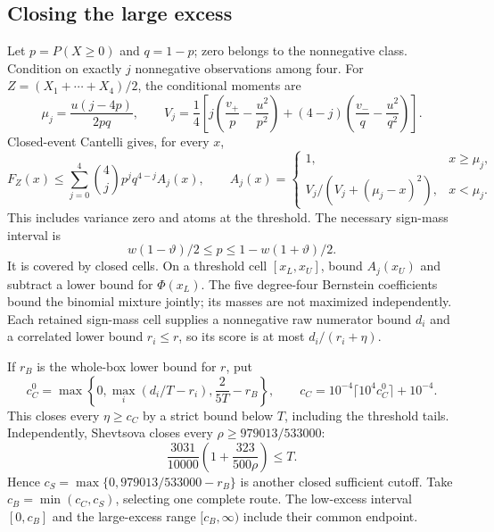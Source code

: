 \documentclass[11pt,a4paper]{article}
\numberwithin{equation}{section}
\theoremstyle{definition}
\theoremstyle{remark}
\begin{document}
\subsection{Closing the large excess}
Let $p=P(X\ge0)$ and $q=1-p$; zero belongs to the nonnegative class.
Condition on exactly $j$ nonnegative observations among four.
For $Z=(X_1+\cdots+X_4)/2$, the conditional moments are
\[
 \mu_j=\frac{u(j-4p)}{2pq},\qquad
 V_j=\frac14\left[j\left(\frac{v_+}{p}-\frac{u^2}{p^2}\right)
 +(4-j)\left(\frac{v_-}{q}-\frac{u^2}{q^2}\right)\right].
\]
Closed-event Cantelli gives, for every $x$,
\begin{equation}\label{n4all:eq:count-cantelli}
 F_Z(x)\le\sum_{j=0}^4\binom4j p^jq^{4-j}A_j(x),\qquad
 A_j(x)=\begin{cases}1,&x\ge\mu_j,\\
 V_j/(V_j+(\mu_j-x)^2),&x<\mu_j.
 \end{cases}
\end{equation}
This includes variance zero and atoms at the threshold. The necessary
sign-mass interval is
\[
 w(1-\vartheta)/2\le p\le1-w(1+\vartheta)/2.
\]
It is covered by closed cells. On a threshold cell $[x_L,x_U]$,
bound $A_j(x_U)$ and subtract a lower bound for $\Phi(x_L)$.
The five degree-four Bernstein coefficients bound the binomial
mixture jointly; its masses are not maximized independently.
Each retained sign-mass cell supplies a nonnegative raw numerator
bound $d_i$ and a correlated lower bound $r_i\le r$, so its score
is at most $d_i/(r_i+\eta)$.

If $r_B$ is the whole-box lower bound for $r$, put
\[
 c_C^0=\max\left\{0,\max_i(d_i/T-r_i),\frac{2}{5T}-r_B\right\},
 \qquad
 c_C=10^{-4}\lceil10^4c_C^0\rceil+10^{-4}.
\]
This closes every $\eta\ge c_C$ by a strict bound below $T$,
including the threshold tails. Independently, Shevtsova closes
every $\rho\ge979013/533000$:
\[
 \frac{3031}{10000}\left(1+\frac{323}{500\rho}\right)\le T.
\]
Hence $c_S=\max\{0,979013/533000-r_B\}$ is another closed sufficient
cutoff. Take $c_B=\min(c_C,c_S)$, selecting one complete route.
The low-excess interval $[0,c_B]$ and the large-excess range
$[c_B,\infty)$ include their common endpoint.
\end{document}
